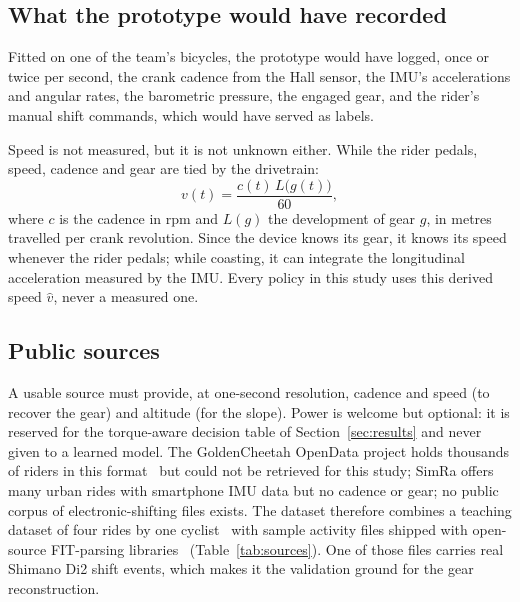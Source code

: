 \documentclass[conference]{IEEEtran}
\newcommand{\vhat}{\hat{v}}
\begin{document}
\subsection{What the prototype would have recorded}
Fitted on one of the team's bicycles, the prototype would have logged, once or twice per second, the crank cadence from the Hall sensor, the IMU's accelerations and angular rates, the barometric pressure, the engaged gear, and the rider's manual shift commands, which would have served as labels.

Speed is not measured, but it is not unknown either. While the rider pedals, speed, cadence and gear are tied by the drivetrain:
\begin{equation}
v(t) = \frac{c(t)\, L\big(g(t)\big)}{60},
\label{eq:speed}
\end{equation}
where $c$ is the cadence in rpm and $L(g)$ the development of gear $g$, in metres travelled per crank revolution. Since the device knows its gear, it knows its speed whenever the rider pedals; while coasting, it can integrate the longitudinal acceleration measured by the IMU. Every policy in this study uses this derived speed $\vhat$, never a measured one.

\subsection{Public sources}
A usable source must provide, at one-second resolution, cadence and speed (to recover the gear) and altitude (for the slope). Power is welcome but optional: it is reserved for the torque-aware decision table of Section~\ref{sec:results} and never given to a learned model. The GoldenCheetah OpenData project holds thousands of riders in this format~\cite{goldencheetah} but could not be retrieved for this study; SimRa offers many urban rides with smartphone IMU data but no cadence or gear; no public corpus of electronic-shifting files exists. The dataset therefore combines a teaching dataset of four rides by one cyclist~\cite{inria} with sample activity files shipped with open-source FIT-parsing libraries~\cite{garminsdk,fitparse,tormoder,muktihari} (Table~\ref{tab:sources}). One of those files carries real Shimano Di2 shift events, which makes it the validation ground for the gear reconstruction.
\end{document}

